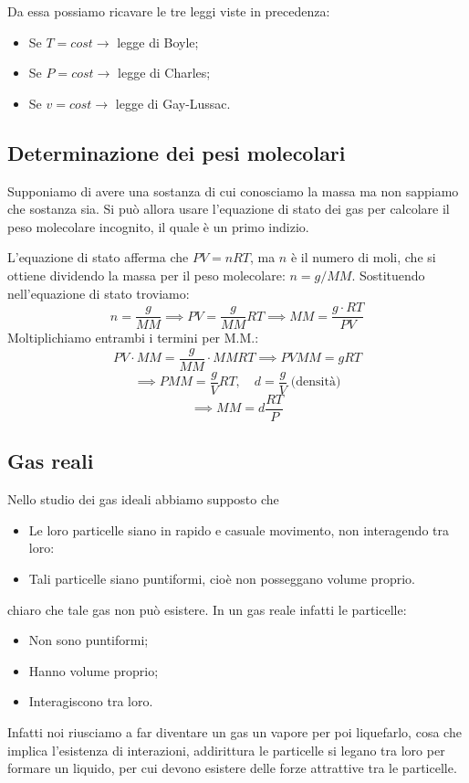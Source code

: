 Da essa possiamo ricavare le tre leggi viste in precedenza:

\begin{itemize}
    \item Se $T=cost \rightarrow$ legge di Boyle;
    \item Se $P=cost \rightarrow$ legge di Charles;
    \item Se $v=cost \rightarrow$ legge di Gay-Lussac.
\end{itemize}
\subsection{Determinazione dei pesi molecolari}
Supponiamo di avere una sostanza di cui conosciamo la massa ma non sappiamo che sostanza sia. Si può allora usare l'equazione di stato dei gas per calcolare il peso molecolare incognito, il quale è un primo indizio.

L'equazione di stato afferma che $PV=nRT$, ma $n$ è il numero di moli, che si ottiene dividendo la massa per il peso molecolare: $n=g/MM$. Sostituendo nell'equazione di stato troviamo:
$$n=\frac{g}{MM} \implies PV=\frac{g}{MM}RT \implies MM=\frac{g \cdot RT}{PV}$$
Moltiplichiamo entrambi i termini per M.M.:
$$PV \cdot MM=\frac{g}{MM}\cdot MM RT \implies PV MM = gRT$$
$$ \implies PMM = \frac{g}{V}RT, \quad d=\frac{g}{V} \; \text{(densità)}$$
$$\implies MM = d \frac{RT}{P}$$
\subsection{Gas reali}
Nello studio dei gas ideali abbiamo supposto che

\begin{itemize}
    \item Le loro particelle siano in rapido e casuale movimento, non interagendo tra loro:
    \item Tali particelle siano puntiformi, cioè non posseggano volume proprio.
\end{itemize}

\E chiaro che tale gas non può esistere. In un gas reale infatti le particelle:

\begin{itemize}
    \item Non sono puntiformi;
    \item Hanno volume proprio;
    \item Interagiscono tra loro. 
\end{itemize}

Infatti noi riusciamo a far diventare un gas un vapore per poi liquefarlo, cosa che implica l'esistenza di interazioni, addirittura le particelle si legano tra loro per formare un liquido, per cui devono esistere delle forze attrattive tra le particelle.

